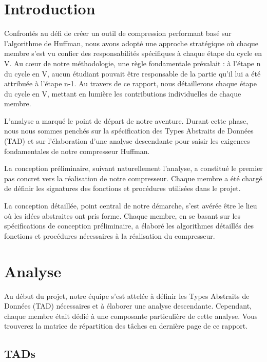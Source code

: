 \documentclass[12pt]{article}
\begin{document}

\newpage

\section{Introduction}
Confrontés au défi de créer un outil de compression performant basé sur l'algorithme de Huffman, nous avons adopté une approche stratégique où chaque membre s'est vu confier des responsabilités spécifiques à chaque étape du cycle en V. Au cœur de notre méthodologie, une règle fondamentale prévalait : à l'étape n du cycle en V, aucun étudiant pouvait être responsable de la partie qu'il lui a été attribuée à l'étape n-1. Au travers de ce rapport, nous détaillerons chaque étape du cycle en V, mettant en lumière les contributions individuelles de chaque membre. \par
L'analyse a marqué le point de départ de notre aventure. Durant cette phase, nous nous sommes penchés sur la spécification des Types Abstraits de Données (TAD) et sur l'élaboration d'une analyse descendante pour saisir les exigences fondamentales de notre compresseur Huffman.\par
La conception préliminaire, suivant naturellement l'analyse, a constitué le premier pas concret vers la réalisation de notre compresseur. Chaque membre a été chargé de définir les signatures des fonctions et procédures utilisées dans le projet. \par
La conception détaillée, point central de notre démarche, s'est avérée être le lieu où les idées abstraites ont pris forme. Chaque membre, en se basant sur les spécifications de conception préliminaire, a élaboré les algorithmes détaillés des fonctions et procédures nécessaires à la réalisation du compresseur.
\newpage

\tableofcontents

\listoffigures


\newpage
\section{Analyse}
Au début du projet, notre équipe s'est attelée à définir les Types Abstraits de Données (TAD) nécessaires et à élaborer une analyse descendante. Cependant, chaque membre était dédié à une composante particulière de cette analyse. Vous trouverez la matrice de répartition des tâches en dernière page de ce rapport.\newline
\subsection{TADs}






\end{document}
